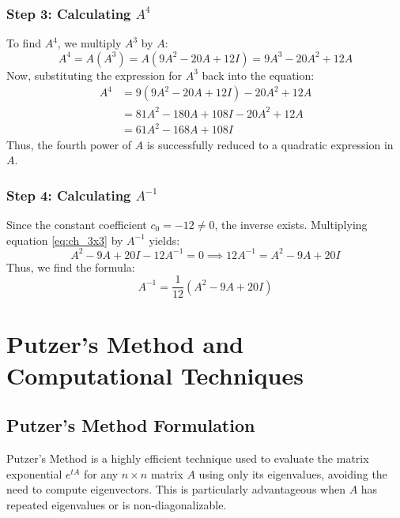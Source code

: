 \documentclass[12pt,a4paper]{report}
\theoremstyle{definition}
\numberwithin{equation}{chapter}
\begin{document}
\subsection*{Step 3: Calculating $A^4$}
To find $A^4$, we multiply $A^3$ by $A$:
\begin{equation}
A^4 = A(A^3) = A(9A^2 - 20A + 12I) = 9A^3 - 20A^2 + 12A
\end{equation}
Now, substituting the expression for $A^3$ back into the equation:
\begin{equation}
\begin{aligned}
A^4 &= 9(9A^2 - 20A + 12I) - 20A^2 + 12A \\
    &= 81A^2 - 180A + 108I - 20A^2 + 12A \\
    &= 61A^2 - 168A + 108I
\end{aligned}
\end{equation}
Thus, the fourth power of $A$ is successfully reduced to a quadratic expression in $A$.

\subsection*{Step 4: Calculating $A^{-1}$}
Since the constant coefficient $c_0 = -12 \ne 0$, the inverse exists. Multiplying equation \eqref{eq:ch_3x3} by $A^{-1}$ yields:
\begin{equation}
A^2 - 9A + 20I - 12A^{-1} = 0 \implies 12A^{-1} = A^2 - 9A + 20I
\end{equation}
Thus, we find the formula:
\begin{equation}
A^{-1} = \frac{1}{12} \left( A^2 - 9A + 20I \right)
\end{equation}


\chapter{Putzer's Method and Computational Techniques}

\section{Putzer's Method Formulation}
Putzer's Method is a highly efficient technique used to evaluate the matrix exponential $e^{tA}$ for any $n \times n$ matrix $A$ using only its eigenvalues, avoiding the need to compute eigenvectors. This is particularly advantageous when $A$ has repeated eigenvalues or is non-diagonalizable.
\end{document}
